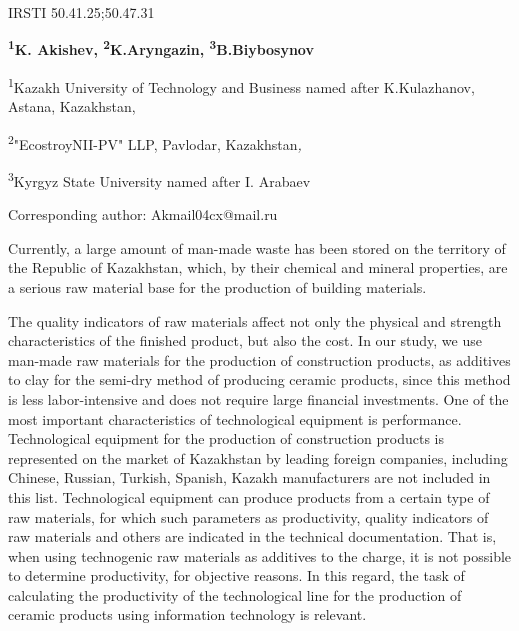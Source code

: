 \newpage
IRSTI 50.41.25;50.47.31


\begin{center}
{\bfseries \textsuperscript{1}K. Akishev\envelope,
\textsuperscript{2}K.Aryngazin, \textsuperscript{3}B.Biybosynov}

\textsuperscript{1}Kazakh University of Technology and Business named
after K.Kulazhanov, Astana, Kazakhstan,

\textsuperscript{2}"EcostroyNII-PV" LLP, Pavlodar, Kazakhstan\emph{,}

\textsuperscript{3}Kyrgyz State University named after I. Arabaev
\end{center}
\envelope Corresponding author: Akmail04cx@mail.ru \vspace{0.5cm}

Currently, a large amount of man-made waste has been stored on the
territory of the Republic of Kazakhstan, which, by their chemical and
mineral properties, are a serious raw material base for the production
of building materials.

The quality indicators of raw materials affect not only the physical and
strength characteristics of the finished product, but also the cost. In
our study, we use man-made raw materials for the production of
construction products, as additives to clay for the semi-dry method of
producing ceramic products, since this method is less labor-intensive
and does not require large financial investments. One of the most
important characteristics of technological equipment is performance.
Technological equipment for the production of construction products is
represented on the market of Kazakhstan by leading foreign companies,
including Chinese, Russian, Turkish, Spanish, Kazakh manufacturers are
not included in this list. Technological equipment can produce products
from a certain type of raw materials, for which such parameters as
productivity, quality indicators of raw materials and others are
indicated in the technical documentation. That is, when using
technogenic raw materials as additives to the charge, it is not possible
to determine productivity, for objective reasons. In this regard, the
task of calculating the productivity of the technological line for the
production of ceramic products using information technology is relevant.

